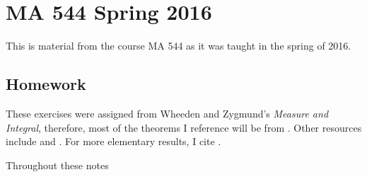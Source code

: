 

\chapter{MA 544 Spring 2016}
\thispagestyle{empty}
This is material from the course MA 544 as it was taught in the spring of
2016.
\bigskip
\section{Homework}
These exercises were assigned from Wheeden and Zygmund's \emph{Measure and
  Integral}, therefore, most of the theorems I reference will be from
\cite{wheeden-zygmund}. Other resources include \cite{folland} and
\cite{royden}. For more elementary results, I cite \cite{rudin-1}.

\bigskip

Throughout these notes

